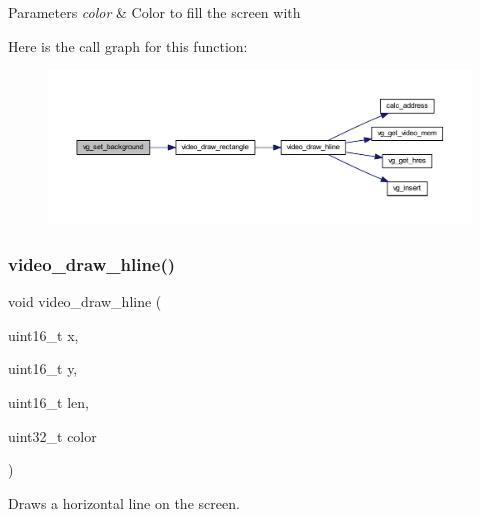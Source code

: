 \begin{DoxyParams}{Parameters}
{\em color} & Color to fill the screen with \\
\hline
\end{DoxyParams}
Here is the call graph for this function\+:\nopagebreak
\begin{figure}[H]
\begin{center}
\leavevmode
\includegraphics[width=350pt]{group__video_ga6e2c7948df1662b15b1977cf20e8e479_cgraph}
\end{center}
\end{figure}
\mbox{\label{group__video_gaa81a86216d20abdc74fffe6a374d7c84}} 
\subsubsection{\texorpdfstring{video\+\_\+draw\+\_\+hline()}{video\_draw\_hline()}}
{\footnotesize\ttfamily void video\+\_\+draw\+\_\+hline (\begin{DoxyParamCaption}\item[{uint16\+\_\+t}]{x,  }\item[{uint16\+\_\+t}]{y,  }\item[{uint16\+\_\+t}]{len,  }\item[{uint32\+\_\+t}]{color }\end{DoxyParamCaption})}



Draws a horizontal line on the screen. 


